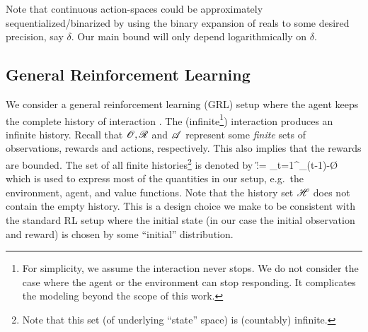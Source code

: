 \documentclass{article} %
\begin{document}
Note that continuous action-spaces could be approximately sequentialized/binarized by using the binary expansion of reals to some desired precision, say $\delta$. Our main bound will only depend logarithmically on $\delta$.

\subsection{General Reinforcement Learning}

We consider a general reinforcement learning (GRL) setup where the agent keeps the complete history of interaction \cite{Hutter2009}. The (infinite\footnote{For simplicity, we assume the interaction never stops. We do not consider the case where the agent or the environment can stop responding. It complicates the modeling beyond the scope of this work.}) interaction produces an infinite history. Recall that $\mathscr{O}, \mathscr{R}$ and $\mathscr{A}$ represent some \emph{finite} sets of observations, rewards and actions, respectively. This also implies that the rewards are bounded. The set of all finite histories\footnote{Note that this set (of underlying ``state'' space) is (countably) infinite.} is denoted by
\beq\label{eq:history}
\H := \bigcup_{t=1}^\infty \underbrace{\O \times \R \times \A \times \dots \times \O \times \R \times \A}_{(t-1)-}\times\O\times\R
\eeq
which is used to express most of the quantities in our setup, e.g.\ the environment, agent, and value functions. Note that the history set $\mathscr{H}$ does not contain the empty history. This is a design choice we make to be consistent with the standard RL setup \cite{Sutton2018} where the initial state (in our case the initial observation and reward) is chosen by some ``initial'' distribution.
\end{document}
